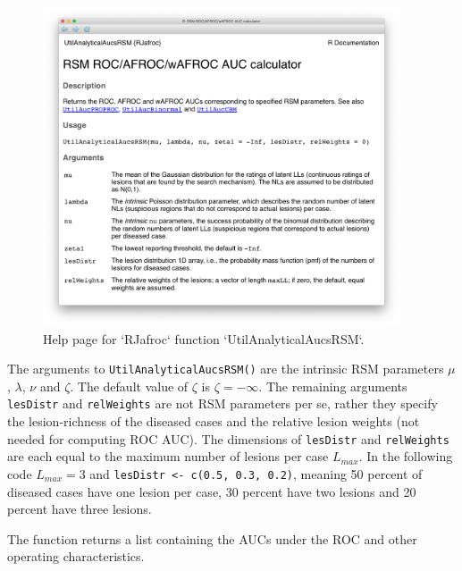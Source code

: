 \documentclass[
]{book}
\begin{document}
\begin{figure}

{\centering \includegraphics[width=300pt]{images/rsm-predictions/util-analytical-aucs-rsm} 

}

\caption{Help page for `RJafroc` function `UtilAnalyticalAucsRSM`.}\label{fig:rsm-predictions-help}
\end{figure}

The arguments to \texttt{UtilAnalyticalAucsRSM()} are the intrinsic RSM parameters \(\mu\), \(\lambda\), \(\nu\) and \(\zeta\). The default value of \(\zeta\) is \(\zeta = -\infty\). The remaining arguments \texttt{lesDistr} and \texttt{relWeights} are not RSM parameters per se, rather they specify the lesion-richness of the diseased cases and the relative lesion weights (not needed for computing ROC AUC). The dimensions of \texttt{lesDistr} and \texttt{relWeights} are each equal to the maximum number of lesions per case \(L_{max}\). In the following code \(L_{max} = 3\) and \texttt{lesDistr\ \textless{}-\ c(0.5,\ 0.3,\ 0.2)}, meaning 50 percent of diseased cases have one lesion per case, 30 percent have two lesions and 20 percent have three lesions.

The function returns a list containing the AUCs under the ROC and other operating characteristics.
\end{document}
